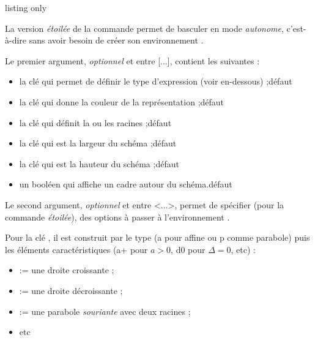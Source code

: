 \begin{PresCodeTexPL}{listing only}
{\tikz[options] \MiniSchemaSignes[clés]}
\end{PresCodeTexPL}

\begin{cautionblock}
 La version \textit{étoilée} de la commande permet de basculer en mode \textit{autonome}, c'est-à-dire sans avoir besoin de créer son environnement \TikZ.

\smallskip

Le premier argument, \textit{optionnel} et entre \textsf{[...]}, contient les  suivantes :

\begin{itemize}
	\item la clé  qui permet de définir le type d'expression (voir en-dessous) ;\hfill{}défaut 
	\item la clé  qui donne la couleur de la représentation ;\hfill{}défaut 
	\item la clé  qui définit la ou les racines ;\hfill{}défaut 
	\item la clé  qui est la largeur du schéma ;\hfill{}défaut 
	\item la clé  qui est la hauteur du schéma ;\hfill{}défaut 
	\item un booléen  qui affiche un cadre autour du schéma.\hfill{}défaut 
\end{itemize}

Le second argument, \textit{optionnel} et entre \textsf{<...>}, permet de spécifier (pour la commande \textit{étoilée}), des options à passer à l'environnement .
\end{cautionblock}

\begin{cautionblock}
Pour la clé , il est construit par le type (\textsf{a} pour affine ou \textsf{p} comme parabole) puis les éléments caractéristiques (\textsf{a+} pour $a>0$, \textsf{d0} pour $\Delta=0$, etc) :

\begin{itemize}
	\item {} := une droite croissante ;
	\item {} := une droite décroissante ;
	\item {} := une parabole \textit{souriante} avec deux racines ;
	\item etc
\end{itemize}
\vspace*{-\baselineskip}\leavevmode
\end{cautionblock}

